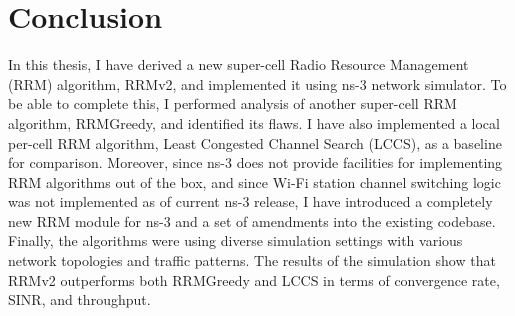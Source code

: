 \section{Conclusion}
\label{chap:eval:sec:conclusion}
In this thesis, I have derived a new super-cell Radio Resource Management (RRM) algorithm, RRMv2, and implemented it using ns-3 network simulator.
To be able to complete this, I performed analysis of another super-cell RRM algorithm, RRMGreedy, and identified its flaws. I have also implemented a local per-cell RRM algorithm, Least Congested Channel Search (LCCS), as a baseline for comparison.
Moreover, since ns-3 does not provide facilities for implementing RRM algorithms out of the box, and since Wi-Fi station channel switching logic was not implemented as of current ns-3 release, I have introduced a completely new RRM module for ns-3 and a set of amendments into the existing codebase.
Finally, the algorithms were using diverse simulation settings with various network topologies and traffic patterns. The results of the simulation show that RRMv2 outperforms both RRMGreedy and LCCS in terms of convergence rate, SINR, and throughput.